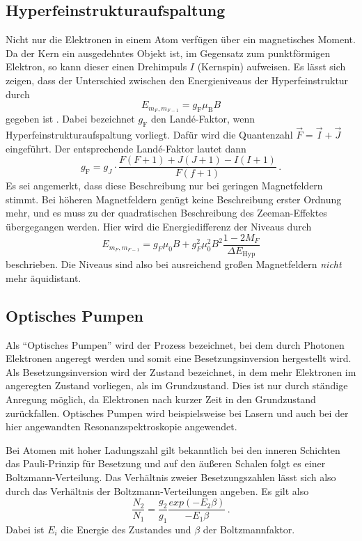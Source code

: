 \subsection{Hyperfeinstrukturaufspaltung}

Nicht nur die Elektronen in einem Atom verfügen über ein magnetisches Moment.
Da der Kern ein ausgedehntes Objekt ist, im Gegensatz zum punktförmigen Elektron, so kann dieser einen Drehimpuls $I$ (Kernspin) aufweisen.
Es lässt sich zeigen, dass der Unterschied zwischen den Energieniveaus der Hyperfeinstruktur durch
\begin{equation}
    E_{m_F,m_{F-1}} = g_\text{F} \mu_\text{B} B
\end{equation}
gegeben ist \cite{demtroeder3}.
Dabei bezeichnet $g_\text{F}$ den Landé-Faktor, wenn Hyperfeinstrukturaufspaltung vorliegt.
Dafür wird die Quantenzahl $\vec{F} = \vec{I} + \vec{J}$ eingeführt.
Der entsprechende Landé-Faktor \cite{optical_pumping} lautet dann
\begin{equation*}
    g_\text{F} = g_J \cdot \frac{F(F+1)+J(J+1)-I(I+1)}{F(f+1)} \, .
\end{equation*}
Es sei angemerkt, dass diese Beschreibung nur bei geringen Magnetfeldern stimmt.
Bei höheren Magnetfeldern genügt keine Beschreibung erster Ordnung mehr, und es muss zu der quadratischen Beschreibung des Zeeman-Effektes übergegangen werden.
Hier wird die Energiedifferenz der Niveaus durch
\begin{equation*}
    E_{m_F,m_{F-1}} = g_F \mu_0 B+g_F^2 \mu_0^2 B^2 \frac{1-2 M_F}{\Delta E_{\mathrm{Hyp}}}
\end{equation*}
beschrieben. Die Niveaus sind also bei ausreichend großen Magnetfeldern \textit{nicht} mehr äquidistant.

\subsection{Optisches Pumpen}

Als \enquote{Optisches Pumpen} wird der Prozess bezeichnet, bei dem durch Photonen Elektronen angeregt werden und somit
eine Besetzungsinversion hergestellt wird.
Als Besetzungsinversion wird der Zustand bezeichnet, in dem mehr Elektronen im angeregten Zustand vorliegen, als im Grundzustand.
Dies ist nur durch ständige Anregung möglich, da Elektronen nach kurzer Zeit in den Grundzustand zurückfallen.
Optisches Pumpen  wird beispielsweise bei Lasern und auch bei der hier angewandten Resonanzspektroskopie angewendet.

Bei Atomen mit hoher Ladungszahl gilt bekanntlich bei den inneren Schichten das Pauli-Prinzip für Besetzung und
auf den äußeren Schalen folgt es einer Boltzmann-Verteilung.
Das Verhältnis zweier Besetzungszahlen lässt sich also durch das Verhältnis der Boltzmann-Verteilungen angeben.
Es gilt also
\begin{equation*}
    \frac{N_2}{N_1} = \frac{g_2}{g_1} \frac{exp(-E_2 \beta)}{-E_1 \beta} \, .
\end{equation*}
Dabei ist $E_i$ die Energie des Zustandes und $\beta$ der Boltzmannfaktor.

